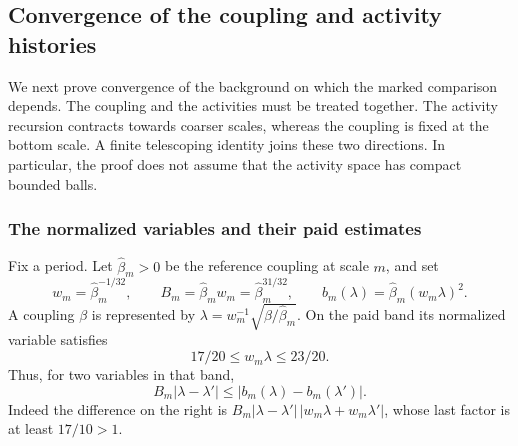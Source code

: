 \subsection{Convergence of the coupling and activity histories}
\label{sec:coupled-background-convergence}
We next prove convergence of the background on which the marked
comparison depends. The coupling and the activities must be treated
together. The activity recursion contracts towards coarser scales,
whereas the coupling is fixed at the bottom scale. A finite telescoping
identity joins these two directions. In particular, the proof does not
assume that the activity space has compact bounded balls.

\subsubsection{The normalized variables and their paid estimates}
Fix a period. Let $\widehat\beta_m>0$ be the reference coupling at
scale $m$, and set
\[
 w_m=\widehat\beta_m^{-1/32},\qquad
 B_m=\widehat\beta_m w_m=\widehat\beta_m^{31/32},\qquad
 b_m(\lambda)=\widehat\beta_m(w_m\lambda)^2.
\]
A coupling $\beta$ is represented by
$\lambda=w_m^{-1}\sqrt{\beta/\widehat\beta_m}$. On the paid
band its normalized variable satisfies
\[
                  17/20\le w_m\lambda\le23/20.
\]
Thus, for two variables in that band,
\begin{equation}\label{eq:coupled-inverse-bound}
 B_m|\lambda-\lambda'|
 \le |b_m(\lambda)-b_m(\lambda')|.
\end{equation}
Indeed the difference on the right is
$B_m|\lambda-\lambda'|\,|w_m\lambda+w_m\lambda'|$, whose last
factor is at least $17/10>1$.

